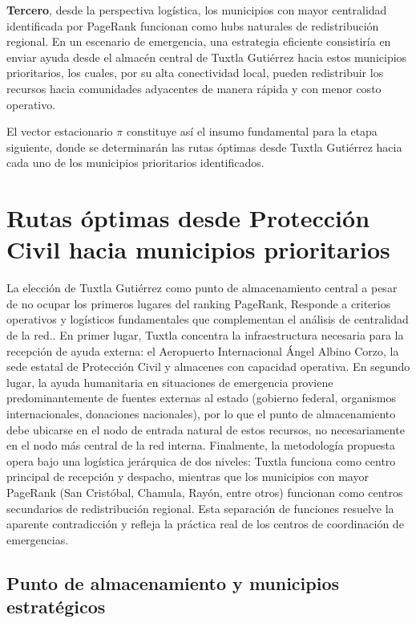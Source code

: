 \documentclass[
  spanish,
  us-letterpaper,
]{scrreprt}
\numberwithin{equation}{section}
\begin{document}
\textbf{Tercero}, desde la perspectiva logística, los municipios con
mayor centralidad identificada por PageRank funcionan como hubs
naturales de redistribución regional. En un escenario de emergencia, una
estrategia eficiente consistiría en enviar ayuda desde el almacén
central de Tuxtla Gutiérrez hacia estos municipios prioritarios, los
cuales, por su alta conectividad local, pueden redistribuir los recursos
hacia comunidades adyacentes de manera rápida y con menor costo
operativo.

El vector estacionario \(\pi\) constituye así el insumo fundamental para
la etapa siguiente, donde se determinarán las rutas óptimas desde Tuxtla
Gutiérrez hacia cada uno de los municipios prioritarios identificados.

\section{Rutas óptimas desde Protección Civil hacia municipios
prioritarios}\label{rutas-uxf3ptimas-desde-protecciuxf3n-civil-hacia-municipios-prioritarios}

La elección de Tuxtla Gutiérrez como punto de almacenamiento central a
pesar de no ocupar los primeros lugares del ranking PageRank, Responde a
criterios operativos y logísticos fundamentales que complementan el
análisis de centralidad de la red.. En primer lugar, Tuxtla concentra la
infraestructura necesaria para la recepción de ayuda externa: el
Aeropuerto Internacional Ángel Albino Corzo, la sede estatal de
Protección Civil y almacenes con capacidad operativa. En segundo lugar,
la ayuda humanitaria en situaciones de emergencia proviene
predominantemente de fuentes externas al estado (gobierno federal,
organismos internacionales, donaciones nacionales), por lo que el punto
de almacenamiento debe ubicarse en el nodo de entrada natural de estos
recursos, no necesariamente en el nodo más central de la red interna.
Finalmente, la metodología propuesta opera bajo una logística jerárquica
de dos niveles: Tuxtla funciona como centro principal de recepción y
despacho, mientras que los municipios con mayor PageRank (San Cristóbal,
Chamula, Rayón, entre otros) funcionan como centros secundarios de
redistribución regional. Esta separación de funciones resuelve la
aparente contradicción y refleja la práctica real de los centros de
coordinación de emergencias.

\subsection{Punto de almacenamiento y municipios
estratégicos}\label{punto-de-almacenamiento-y-municipios-estratuxe9gicos}
\end{document}
